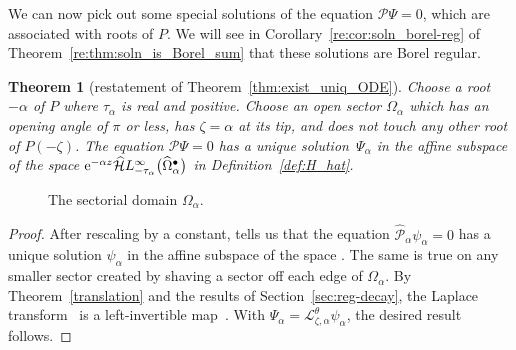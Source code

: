 \documentclass[pdftex]{sigma}
\newcommand{\singexp}[2]{\mathcal{H}L^\infty_{#1, #2}}
\newcommand{\singexpalg}[1]{\singexp{#1}{\bullet}}
\newcommand{\dualsingexp}[1]{\widehat{\mathcal{H}}L^\infty_{#1}}
\newcommand{\laplace}{\mathcal{L}}
\numberwithin{equation}{section}
\newtheorem{Theorem}{Theorem}[section]
\begin{document}
We can now pick out some special solutions of the equation $\mathcal{P}\Psi = 0$, which are associated with roots of $P$. We will see in Corollary~\ref{re:cor:soln_borel-reg} of Theorem~\ref{re:thm:soln_is_Borel_sum} that these solutions are Borel regular.
\begin{Theorem}[restatement of Theorem~\ref{thm:exist_uniq_ODE}]\label{re:thm:exist_uniq_ODE}
Choose a root $-\alpha$ of $P$ where $\tau_\alpha$ is real and positive. Choose an open sector $\Omega_\alpha$ which has an opening angle of $\pi$ or less, has $\zeta = \alpha$ at its tip, and does not touch any other root of $P(-\zeta)$. The equation $\mathcal{P}\Psi = 0$ has a unique solution~$\Psi_\alpha$ in the affine subspace
\smash{${\rm e}^{-\alpha z} \bigl[ z^{-\tau_\alpha} + \dualsingexp{-\tau_\alpha-1}\bigl(\widehat{\Omega}_\alpha^\bullet\bigr) \bigr] $}
of the space ${\rm e}^{-\alpha z} \dualsingexp{-\tau_\alpha}\bigl(\widehat{\Omega}_\alpha^\bullet\bigr)$ in Definition~{\rm\ref{def:H_hat}}.
\end{Theorem}
\begin{figure}[!ht]\centering\vspace{-18mm}
\hspace*{-25mm}\vspace{-12mm}

\caption{The sectorial domain $\Omega_\alpha$.}\label{fig:sectorial_domain--with roots P}
\end{figure}
\begin{proof}
After rescaling by a constant, \cite[Theorem~4.6]{reg-sing-volterra} tells us that the equation $\hat{\mathcal{P}}_\alpha \psi_\alpha = 0$ has a unique solution $\psi_\alpha$ in the affine subspace
\smash{$ \frac{\zeta^{\tau_\alpha-1}}{\Gamma(\tau_\alpha)} + \singexpalg{\tau_\alpha}(\Omega_\alpha) $}
of the space \smash{$\singexpalg{\tau_\alpha-1}(\Omega_\alpha)$}. The same is true on any smaller sector created by shaving a sector off each edge of $\Omega_\alpha$. By Theorem~\ref{translation} and the results of Section~\ref{sec:reg-decay}, the Laplace transform~\smash{$\laplace^\theta_{\zeta, \alpha}$} is a left-invertible map~\smash{$\singexpalg{\tau_\alpha}(\Omega_\alpha) \to {\rm e}^{-\alpha z} \dualsingexp{-\tau_\alpha-1}\bigl(\widehat{\Omega}_\alpha^\bullet\bigr)$}.
With $\Psi_\alpha = \laplace^\theta_{\zeta, \alpha} \psi_\alpha$, the desired result follows.
\end{proof}
\end{document}
